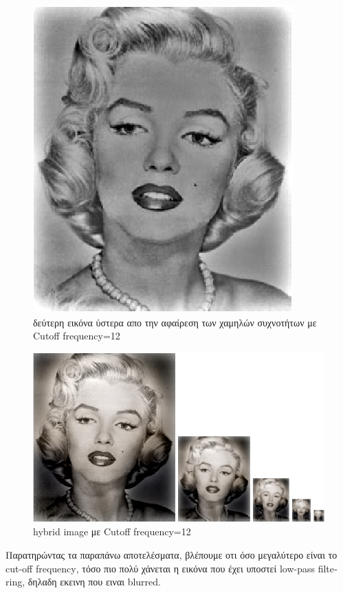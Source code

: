\documentclass{article}
\newcommand{\tl}[1]{\textlatin{#1}}
\begin{document}
 	\begin{figure}[H]
 		\centering
 		\includegraphics[scale=1]{./res/fig_2_2.eps}
 		\caption{δεύτερη εικόνα ύστερα απο την αφαίρεση των χαμηλών συχνοτήτων με \tl{Cutoff frequency}=12}
 	\end{figure}
 	
 	\begin{figure}[H]
 		\centering
 		\includegraphics[scale=1]{./res/fig_2_3.eps}
 		\caption{\tl{hybrid image} με \tl{Cutoff frequency}=12}
 	\end{figure}
	
	\noindent
	Παρατηρώντας τα παραπάνω αποτελέσματα, βλέπουμε οτι όσο μεγαλύτερο είναι το \tl{cut-off frequency}, τόσο πιο πολύ χάνεται η εικόνα που έχει υποστεί \tl{low-pass filtering}, δηλαδη εκεινη που ειναι \tl{blurred}.\\
	
\end{document}
